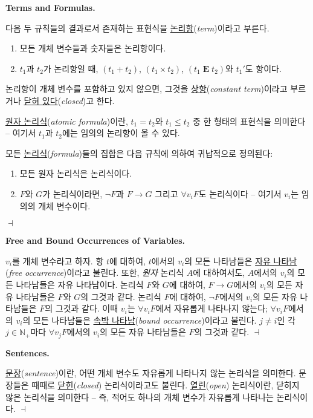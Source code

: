 \documentclass[12pt]{paper}
\newenvironment{context}[1][]
{ \noindent \textbf{{#1}.}
}
{ \hfill $ \dashv $
}
\begin{document}
\begin{context}[Terms and Formulas]
다음 두 규칙들의 결과로서 존재하는 표현식을 \underline{논리항}(\textit{term})이라고 부른다.
\begin{enumerate}
\item 모든 개체 변수들과 숫자들은 논리항이다.
\item $t_{1}$과 $t_{2}$가 논리항일 때, $\left( t_{1} + t_{2} \right)$, $\left( t_{1} \times t_{2} \right)$, $\left( t_{1} \mathop{\mathbf{E}} t_{2} \right)$와 $t_{1} '$도 항이다.
\end{enumerate}

논리항이 개체 변수를 포함하고 있지 않으면, 그것을 \underline{상항}(\textit{constant term})이라고 부르거나 \underline{닫혀 있다}(\textit{closed})고 한다.

\underline{원자 논리식}(\textit{atomic formula})이란,
$t_{1} = t_{2}$와 $t_{1} \leq t_{2}$ 중 한 형태의 표현식을 의미한다 --
여기서 $t_{1}$과 $t_{2}$에는 임의의 논리항이 올 수 있다.

모든 \underline{논리식}(\textit{formula})들의 집합은 다음 규칙에 의하여 귀납적으로 정의된다:
\begin{enumerate}
\item 모든 원자 논리식은 논리식이다.
\item $F$와 $G$가 논리식이라면, $\lnot F$과 $F \rightarrow G$ 그리고 $\forall v_{i} F$도 논리식이다 --
여기서 $v_{i}$는 임의의 개체 변수이다.
\end{enumerate}
\end{context}

\begin{context}[Free and Bound Occurrences of Variables]
$v_{i}$를 개체 변수라고 하자.
항 $t$에 대하여, $t$에서의 $v_{i}$의 모든 나타남들은 \underline{자유 나타남}(\textit{free occurrence})이라고 불린다.
또한, \textit{원자} 논리식 $A$에 대하여서도, $A$에서의 $v_{i}$의 모든 나타남들은 자유 나타남이다.
논리식 $F$와 $G$에 대하여, $F \rightarrow G$에서의 $v_{i}$의 모든 자유 나타남들은 $F$와 $G$의 그것과 같다.
논리식 $F$에 대하여, $\lnot F$에서의 $v_{i}$의 모든 자유 나타남들은 $F$의 그것과 같다.
이때 $v_{i}$는 $\forall v_{i} F$에서 자유롭게 나타나지 않는다;
$\forall v_{i} F$에서의 $v_{i}$의 모든 나타남들은 \underline{속박 나타남}(\textit{bound occurrence})이라고 불린다.
$j \neq i$인 각 $j \in \mathbb{N}_{+}$마다 $\forall v_{j} F$에서의 $v_{i}$의 모든 자유 나타남들은 $F$의 그것과 같다.
\end{context}

\begin{context}[Sentences]
\underline{문장}(\textit{sentence})이란, 어떤 개체 변수도 자유롭게 나타나지 않는 논리식을 의미한다.
문장들은 때때로 \underline{닫힌}(\textit{closed}) 논리식이라고도 불린다.
\underline{열린}(\textit{open}) 논리식이란, 닫히지 않은 논리식을 의미한다 --
즉, 적어도 하나의 개체 변수가 자유롭게 나타나는 논리식이다.
\end{context}
\end{document}
